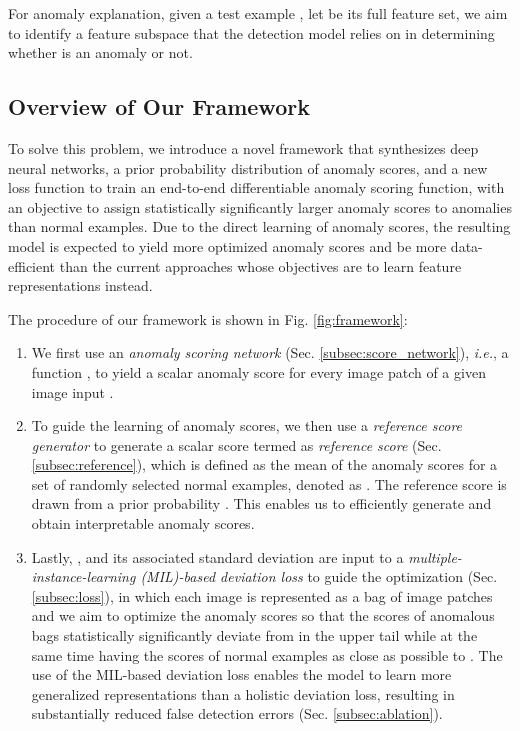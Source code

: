 \documentclass[10pt,journal,compsoc]{IEEEtran}
\begin{document}
For anomaly explanation, given a test example , let  be its full feature set, we aim to identify a feature subspace  that the detection model  relies on in determining whether  is an anomaly or not.


\subsection{Overview of Our Framework}

To solve this problem, we introduce a novel framework that synthesizes deep neural networks, a prior probability distribution of anomaly scores, and a new loss function to train an end-to-end differentiable anomaly scoring function, with an objective to assign statistically significantly larger anomaly scores to anomalies than normal examples. Due to the direct learning of anomaly scores, the resulting model is expected to yield more optimized anomaly scores and be more data-efficient than the current approaches whose objectives are to learn feature representations instead. 

The procedure of our framework is shown in Fig. \ref{fig:framework}: 
\begin{enumerate}
    \item We first use an \textit{anomaly scoring network} (Sec. \ref{subsec:score_network}), \textit{i.e.}, a function , to yield a scalar anomaly score for every image patch of a given image input .
    \item To guide the learning of anomaly scores, we then use a \textit{reference score generator} to generate a scalar score termed as \textit{reference score} (Sec. \ref{subsec:reference}), which is defined as the mean of the anomaly scores  for a set of  randomly selected normal examples, denoted as . The reference score  is
drawn from a prior probability . This enables us to efficiently generate  and obtain interpretable anomaly scores. 
    \item Lastly, ,  and its associated standard deviation  are input to a  \textit{multiple-instance-learning (MIL)-based deviation loss}  to guide the optimization (Sec. \ref{subsec:loss}), in which each image is represented as a bag of image patches and we aim to optimize the anomaly scores so that the scores of anomalous bags statistically significantly deviate from  in the upper tail while at the same time having the scores of normal examples as close as possible to . The use of the MIL-based deviation loss enables the model to learn more generalized representations than a holistic deviation loss, resulting in substantially reduced false detection errors (Sec. \ref{subsec:ablation}).
\end{enumerate}
\end{document}
